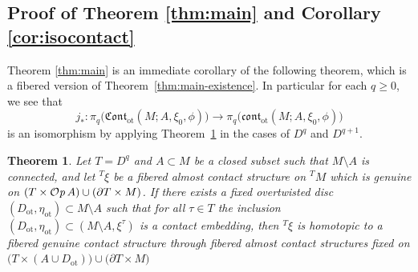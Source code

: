 \documentclass[12pt]{paper}
\theoremstyle{plain}
\newtheorem{theorem}{Theorem}[section]
\theoremstyle{definition}
\newcommand{\p}{\partial}
\newcommand{\Cont}{\mathfrak{Cont}}
\newcommand{\cont}{\mathfrak{cont}}
\newcommand{\ot}{\mathrm{ot}}
\def\Op{{\mathcal O}{\it p}\,}
\numberwithin{figure}{section}
\begin{document}
\subsection{Proof of Theorem \ref{thm:main} and Corollary \ref{cor:isocontact}}\label{sec:proof-main}
Theorem \ref{thm:main} is an immediate corollary of the following theorem, which is a fibered version of Theorem~\ref{thm:main-existence}.  In particular for each $q \geq 0$, we see that
$$
 j_*: \pi_q\big(\Cont_\ot(M;A,\xi_0,\phi)\big) \to \pi_q\big(\cont_\ot(M;A,\xi_0,\phi)\big)
$$
is an isomorphism by applying Theorem~\ref{thm:main-existence-T} in the cases of 
$D^q$ and $D^{q+1}$.

  \begin{theorem}\label{thm:main-existence-T} 
  Let $T = D^q$ and $A \subset M$ be a closed subset such that $M \setminus A$ is connected, and let 
  ${}^T\xi$ be a fibered almost contact structure on ${}^T M$ which is genuine on 
  $(T\times \Op A) \cup (\p T\times M)$.
  If there exists a fixed overtwisted disc $(D_\ot, \eta_{\ot}) \subset M\setminus A$ such that for all
  $\tau \in T$ the inclusion $(D_\ot, \eta_{\ot}) \subset (M \setminus A, \xi^\tau)$ is a contact embedding,
  then ${}^T\xi$ is homotopic   to a fibered genuine contact structure   through fibered almost contact structures
fixed on $\big(T\times (A\cup D_\ot)\big)\cup\big(\p T\times M\big)$
 \end{theorem}
 
\end{document}
